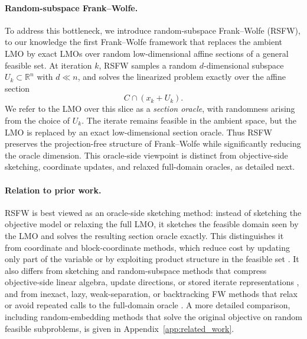 \documentclass{article}
\begin{document}
\paragraph{Random-subspace Frank--Wolfe.}
To address this bottleneck, we introduce random-subspace Frank--Wolfe (RSFW), to our knowledge the first
Frank--Wolfe framework that replaces the ambient LMO by exact LMOs over random
low-dimensional affine sections of a general feasible set. At iteration $k$, RSFW samples a random $d$-dimensional subspace
$U_k \subset \mathbb{R}^n$ with $d \ll n$, and solves the linearized problem
exactly over the affine section
\[
C \cap (x_k + U_k).
\]
We refer to the LMO over this slice as a \emph{section oracle},
with randomness arising from the choice of $U_k$.
The iterate remains feasible in the ambient space, but the LMO is replaced by
an exact low-dimensional section oracle. Thus RSFW preserves the
projection-free structure of Frank--Wolfe while significantly reducing the
oracle dimension. This oracle-side viewpoint is distinct from objective-side sketching,
coordinate updates, and relaxed full-domain oracles, as detailed next.

\paragraph{Relation to prior work.}
RSFW is best viewed as an oracle-side sketching method: instead of sketching the
objective model or relaxing the full LMO, it sketches the feasible domain seen
by the LMO and solves the resulting section oracle exactly. This distinguishes
it from coordinate and block-coordinate methods, which reduce cost by updating
only part of the variable or by exploiting product structure in the feasible set
\cite{Nesterov2012CoordinateDescent,RichtarikTakac2014RBCD,LacosteJulienJaggiSchmidtPletscher2013BlockCoordinateFW}.
It also differs from sketching and random-subspace methods that compress
objective-side linear algebra, update directions, or stored iterate
representations
\cite{PilanciWainwright2016IterativeHessianSketch,LacottePilanciPavone2019AdaptiveRandomSubspaces,YurtseverUdellTroppCevher2017Sketchy},
and from inexact, lazy, weak-separation, or backtracking FW methods that relax
or avoid repeated calls to the full-domain oracle
\cite{BraunPokuttaZink2017Lazifying,BraunPokuttaTuWright2019Blended,PedregosaNegiarAskariJaggi2020Backtracking,ZhouSun2022ApproximateFW}.
A more detailed comparison, including random-embedding methods that solve the
original objective on random feasible subproblems, is given in
Appendix~\ref{app:related_work}.
\end{document}
